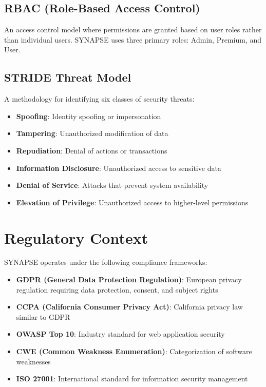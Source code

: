 \documentclass{report}
\begin{document}
\subsection{RBAC (Role-Based Access Control)}
An access control model where permissions are granted based on user roles rather than individual users. SYNAPSE uses three primary roles: Admin, Premium, and User.

\subsection{STRIDE Threat Model}
A methodology for identifying six classes of security threats:
\begin{itemize}
\item \textbf{Spoofing}: Identity spoofing or impersonation
\item \textbf{Tampering}: Unauthorized modification of data
\item \textbf{Repudiation}: Denial of actions or transactions
\item \textbf{Information Disclosure}: Unauthorized access to sensitive data
\item \textbf{Denial of Service}: Attacks that prevent system availability
\item \textbf{Elevation of Privilege}: Unauthorized access to higher-level permissions
\end{itemize}

\section{Regulatory Context}

SYNAPSE operates under the following compliance frameworks:

\begin{itemize}
\item \textbf{GDPR (General Data Protection Regulation)}: European privacy regulation requiring data protection, consent, and subject rights
\item \textbf{CCPA (California Consumer Privacy Act)}: California privacy law similar to GDPR
\item \textbf{OWASP Top 10}: Industry standard for web application security
\item \textbf{CWE (Common Weakness Enumeration)}: Categorization of software weaknesses
\item \textbf{ISO 27001}: International standard for information security management
\end{itemize}
\end{document}
